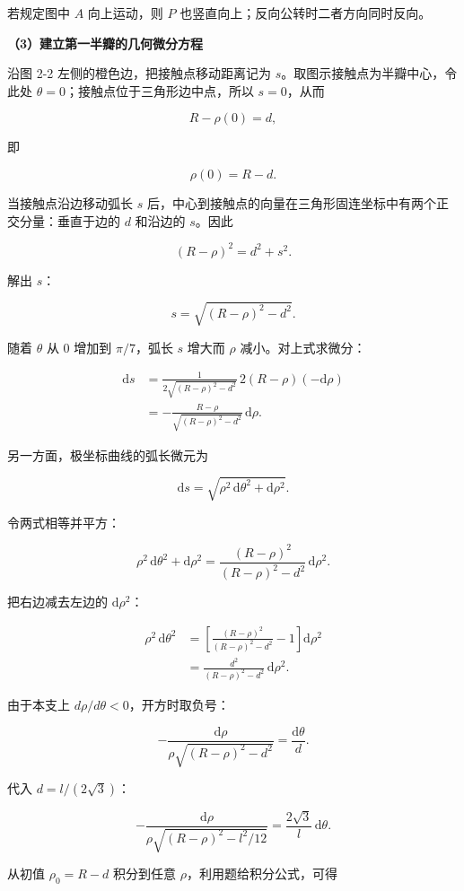 \documentclass[12pt,a4paper,UTF8]{ctexart}
\begin{document}
若规定图中 \(A\) 向上运动，则 \(P\)
也竖直向上；反向公转时二者方向同时反向。

\textbf{（3）建立第一半瓣的几何微分方程}

沿图 2-2 左侧的橙色边，把接触点移动距离记为
\(s\)。取图示接触点为半瓣中心，令此处
\(\theta=0\)；接触点位于三角形边中点，所以 \(s=0\)，从而

\[R-\rho(0)=d,\]

即

\[\rho(0)=R-d.\]

当接触点沿边移动弧长 \(s\)
后，中心到接触点的向量在三角形固连坐标中有两个正交分量：垂直于边的 \(d\)
和沿边的 \(s\)。因此

\[(R-\rho)^2=d^2+s^2.\]

解出 \(s\)：

\[s=\sqrt{(R-\rho)^2-d^2}.\]

随着 \(\theta\) 从 \(0\) 增加到 \(\pi/7\)，弧长 \(s\) 增大而 \(\rho\)
减小。对上式求微分：

\[\begin{aligned}
\mathrm{d}s
&=\frac{1}{2\sqrt{(R-\rho)^2-d^2}}\,2(R-\rho)(-\mathrm{d}\rho)\\
&=-\frac{R-\rho}{\sqrt{(R-\rho)^2-d^2}}\,\mathrm{d}\rho.
\end{aligned}\]

另一方面，极坐标曲线的弧长微元为

\[\mathrm{d}s=\sqrt{\rho^2\,\mathrm{d}\theta^2+\mathrm{d}\rho^2}.\]

令两式相等并平方：

\[\rho^2\,\mathrm{d}\theta^2+\mathrm{d}\rho^2
=\frac{(R-\rho)^2}{(R-\rho)^2-d^2}\,\mathrm{d}\rho^2.\]

把右边减去左边的 \(\mathrm{d}\rho^2\)：

\[\begin{aligned}
\rho^2\,\mathrm{d}\theta^2
&=\left[
\frac{(R-\rho)^2}{(R-\rho)^2-d^2}-1
\right]\mathrm{d}\rho^2\\
&=\frac{d^2}{(R-\rho)^2-d^2}\,\mathrm{d}\rho^2.
\end{aligned}\]

由于本支上 \(d\rho/d\theta<0\)，开方时取负号：

\[\boxed{
-\frac{\mathrm{d}\rho}{\rho\sqrt{(R-\rho)^2-d^2}}
=\frac{\mathrm{d}\theta}{d}
}.\]

代入 \(d=l/(2\sqrt3)\)：

\[-\frac{\mathrm{d}\rho}{\rho\sqrt{(R-\rho)^2-l^2/12}}
=\frac{2\sqrt3}{l}\,\mathrm{d}\theta.\]

从初值 \(\rho_0=R-d\) 积分到任意 \(\rho\)，利用题给积分公式，可得
\end{document}
